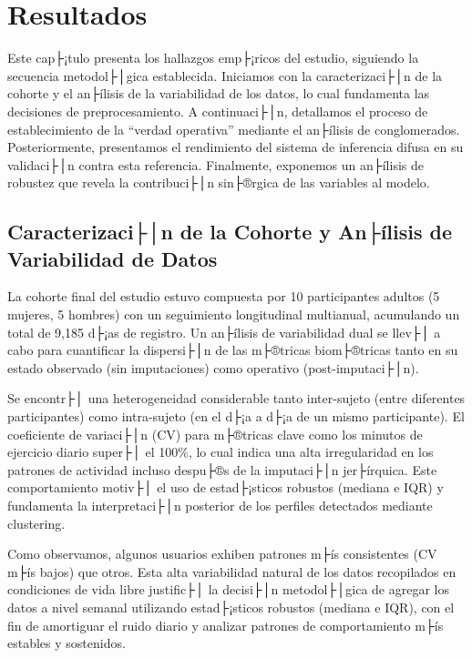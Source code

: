 ﻿\chapter{Resultados}
\label{chap:resultados}

\noindent Este cap├¡tulo presenta los hallazgos emp├¡ricos del estudio, siguiendo la secuencia metodol├│gica establecida. Iniciamos con la caracterizaci├│n de la cohorte y el an├ílisis de la variabilidad de los datos, lo cual fundamenta las decisiones de preprocesamiento. A continuaci├│n, detallamos el proceso de establecimiento de la ``verdad operativa'' mediante el an├ílisis de conglomerados. Posteriormente, presentamos el rendimiento del sistema de inferencia difusa en su validaci├│n contra esta referencia. Finalmente, exponemos un an├ílisis de robustez que revela la contribuci├│n sin├®rgica de las variables al modelo.

\section{Caracterizaci├│n de la Cohorte y An├ílisis de Variabilidad de Datos}
\label{sec:caracterizacion_cohorte}

La cohorte final del estudio estuvo compuesta por 10 participantes adultos (5 mujeres, 5 hombres) con un seguimiento longitudinal multianual, acumulando un total de 9,185 d├¡as de registro. Un an├ílisis de variabilidad dual se llev├│ a cabo para cuantificar la dispersi├│n de las m├®tricas biom├®tricas tanto en su estado observado (sin imputaciones) como operativo (post-imputaci├│n).

Se encontr├│ una heterogeneidad considerable tanto inter-sujeto (entre diferentes participantes) como intra-sujeto (en el d├¡a a d├¡a de un mismo participante). El coeficiente de variaci├│n (CV) para m├®tricas clave como los minutos de ejercicio diario super├│ el 100\%, lo cual indica una alta irregularidad en los patrones de actividad incluso despu├®s de la imputaci├│n jer├írquica. Este comportamiento motiv├│ el uso de estad├¡sticos robustos (mediana e IQR) y fundamenta la interpretaci├│n posterior de los perfiles detectados mediante clustering.

Como observamos, algunos usuarios exhiben patrones m├ís consistentes (CV m├ís bajos) que otros. Esta alta variabilidad natural de los datos recopilados en condiciones de vida libre justific├│ la decisi├│n metodol├│gica de agregar los datos a nivel semanal utilizando estad├¡sticos robustos (mediana e IQR), con el fin de amortiguar el ruido diario y analizar patrones de comportamiento m├ís estables y sostenidos.

